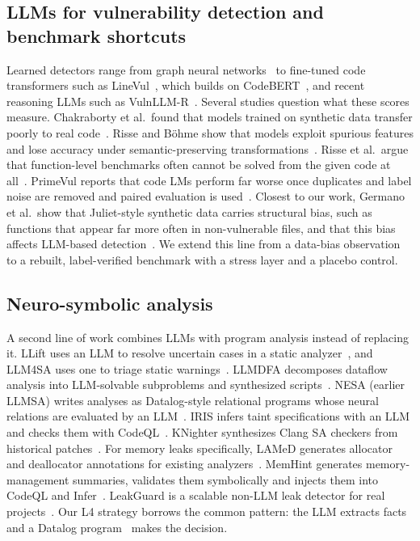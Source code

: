 \subsection{LLMs for vulnerability detection and benchmark shortcuts}
Learned detectors range from graph neural networks~\cite{zhou2019devign} to fine-tuned code transformers such as LineVul~\cite{fu2022linevul}, which builds on CodeBERT~\cite{feng2020codebert}, and recent reasoning LLMs such as VulnLLM-R~\cite{nie2025vulnllmr}.
Several studies question what these scores measure.
Chakraborty et al.\ found that models trained on synthetic data transfer poorly to real code~\cite{chakraborty2021reveal}.
Risse and B\"ohme show that models exploit spurious features and lose accuracy under semantic-preserving transformations~\cite{risse2024limits}.
Risse et al.\ argue that function-level benchmarks often cannot be solved from the given code at all~\cite{risse2025topscore}.
PrimeVul reports that code LMs perform far worse once duplicates and label noise are removed and paired evaluation is used~\cite{ding2025primevul}.
Closest to our work, Germano et al.\ show that Juliet-style synthetic data carries structural bias, such as  functions that appear far more often in non-vulnerable files, and that this bias affects LLM-based detection~\cite{germano2025biased}.
We extend this line from a data-bias observation to a rebuilt, label-verified benchmark with a stress layer and a placebo control.

\subsection{Neuro-symbolic analysis}
A second line of work combines LLMs with program analysis instead of replacing it.
LLift uses an LLM to resolve uncertain cases in a static analyzer~\cite{li2024llift}, and LLM4SA uses one to triage static warnings~\cite{wen2024llm4sa}.
LLMDFA decomposes dataflow analysis into LLM-solvable subproblems and synthesized scripts~\cite{wang2024llmdfa}.
NESA (earlier LLMSA) writes analyses as Datalog-style relational programs whose neural relations are evaluated by an LLM~\cite{wang2026nesa}.
IRIS infers taint specifications with an LLM and checks them with CodeQL~\cite{li2025iris}.
KNighter synthesizes Clang SA checkers from historical patches~\cite{yang2025knighter}.
For memory leaks specifically, LAMeD generates allocator and deallocator annotations for existing analyzers~\cite{shemetova2025lamed}.
MemHint generates memory-management summaries, validates them symbolically and injects them into CodeQL and Infer~\cite{huang2026memhint}.
LeakGuard is a scalable non-LLM leak detector for real projects~\cite{liang2025leakguard}.
Our L4 strategy borrows the common pattern: the LLM extracts facts and a Datalog program~\cite{jordan2016souffle} makes the decision.

